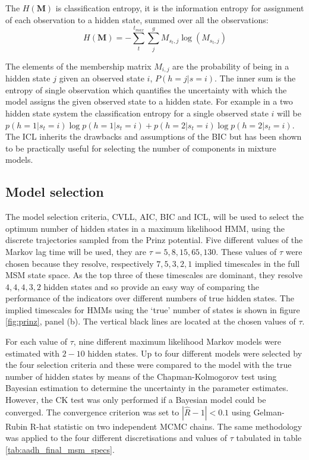 The $H\left(\mathbf{M}\right)$ is classification entropy, it is  the information entropy for assignment of each observation to a hidden state, summed over all the observations: 
\begin{equation}
    H(\mathbf{M}) = -\sum_{t}^{t_{max}} \sum_{j}^{g} M_{s_{t}, j}\log{\left(M_{s_{t}, j}\right)}
\end{equation}

The elements of the membership matrix  $M_{i,j}$ are the probability of being in a hidden state $j$ given an observed state $i$, $P(h=j|s=i)$. The inner sum is the entropy of single observation which quantifies the uncertainty with which the model assigns the given observed state to a hidden state. For example in a two hidden state system the classification entropy for a single observed state $i$ will be $p(h=1|s_t=i)\log{p(h=1|s_t=i)} + p(h=2|s_t=i)\log{p(h=2|s_t=i)}$. The ICL inherits the drawbacks and assumptions of the BIC but has been shown to be practically useful for selecting the number of components in mixture models. 


\subsection{Model selection}

The model selection criteria, CVLL, AIC, BIC and ICL, will be used to select the optimum number of hidden states in a maximum likelihood HMM, using the discrete trajectories sampled from the Prinz potential. Five different values of the Markov lag time will be used, they are $\tau=5, 8, 15, 65, 130$. These values of $\tau$ were chosen because they resolve, respectively $7, 5, 3, 2, 1$ implied timescales in the full MSM state space. As the top three of these timescales are dominant, they resolve $4, 4, 4, 3, 2$ hidden states and so provide an easy way of comparing the performance of the indicators over different numbers of true hidden states\cite{noeProjectedHiddenMarkov2013a}. The implied timescales for HMMs using the `true' number of states is shown in figure \ref{fig:prinz}, panel (b). The vertical black lines are located at the chosen values of $\tau$.

For each value of $\tau$, nine different maximum likelihood Markov models were estimated with $2 - 10$ hidden states. Up to four different models were selected by the four selection criteria and these were compared to the model with the true number of hidden states by means of the Chapman-Kolmogorov test using Bayesian estimation to determine the uncertainty in the parameter estimates. However, the CK test was only performed if a Bayesian model could be converged. The convergence criterion was set to $|\hat{R}-1|<0.1$ using Gelman-Rubin R-hat statistic on two independent MCMC chains. The same methodology was applied to the four different discretisations and values of $\tau$ tabulated in table \ref{tab:aadh_final_msm_specs}. 


